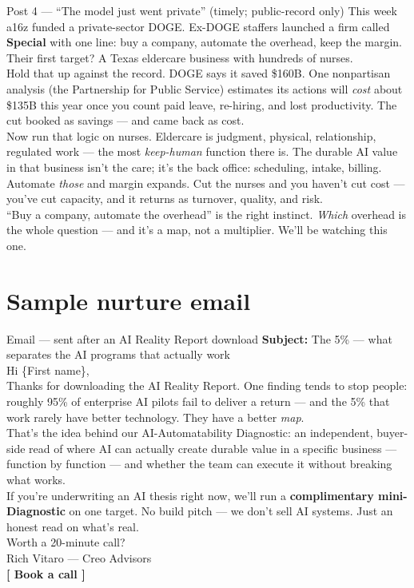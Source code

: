 \documentclass[11pt]{article}
\begin{document}
\begin{copybox}{Post 4 --- ``The model just went private'' (timely; public-record only)}
This week a16z funded a private-sector DOGE. Ex-DOGE staffers launched a firm called \textbf{Special}
with one line: buy a company, automate the overhead, keep the margin. Their first target? A Texas
eldercare business with hundreds of nurses.\\[3pt]
Hold that up against the record. DOGE says it saved \$160B. One nonpartisan analysis (the
Partnership for Public Service) estimates its actions will \emph{cost} about \$135B this year once
you count paid leave, re-hiring, and lost productivity. The cut booked as savings --- and came back
as cost.\\[3pt]
Now run that logic on nurses. Eldercare is judgment, physical, relationship, regulated work --- the
most \emph{keep-human} function there is. The durable AI value in that business isn't the care; it's
the back office: scheduling, intake, billing. Automate \emph{those} and margin expands. Cut the
nurses and you haven't cut cost --- you've cut capacity, and it returns as turnover, quality, and risk.\\[3pt]
``Buy a company, automate the overhead'' is the right instinct. \emph{Which} overhead is the whole
question --- and it's a map, not a multiplier. We'll be watching this one.
\end{copybox}

\section{Sample nurture email}
\begin{copybox}{Email --- sent after an AI Reality Report download}
\textbf{Subject:} The 5\% --- what separates the AI programs that actually work\\[4pt]
Hi \{First name\},\\[3pt]
Thanks for downloading the AI Reality Report. One finding tends to stop people: roughly 95\% of
enterprise AI pilots fail to deliver a return --- and the 5\% that work rarely have better
technology. They have a better \emph{map}.\\[3pt]
That's the idea behind our AI-Automatability Diagnostic: an independent, buyer-side read of where
AI can actually create durable value in a specific business --- function by function --- and
whether the team can execute it without breaking what works.\\[3pt]
If you're underwriting an AI thesis right now, we'll run a \textbf{complimentary mini-Diagnostic}
on one target. No build pitch --- we don't sell AI systems. Just an honest read on what's real.\\[3pt]
Worth a 20-minute call?\\[3pt]
Rich Vitaro --- Creo Advisors\\
\textbf{[ Book a call ]}
\end{copybox}
\end{document}
